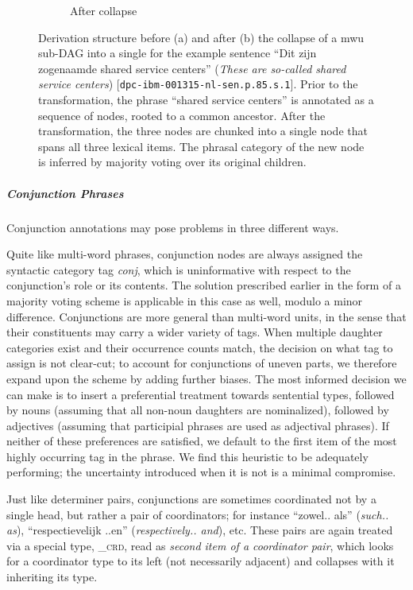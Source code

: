 \begin{figure}[t]
\begin{subfigure}[t]{0.43\textwidth}
        \caption{After collapse}
    \end{subfigure}
    \caption[Multi-Word Unit Collapse]{Derivation structure before (a) and after (b) the collapse of a mwu sub-DAG into a single for the example sentence ``Dit zijn zogenaamde shared service centers'' (\textit{These are so-called shared service centers}) [\texttt{dpc-ibm-001315-nl-sen.p.85.s.1}]. Prior to the transformation, the phrase ``shared service centers'' is annotated as a sequence of nodes, rooted to a common ancestor. After the transformation, the three nodes are chunked into a single node that spans all three lexical items. The phrasal category of the new node is inferred by majority voting over its original children.}
    \label{fig:mwu}
\end{figure}

\subparagraph{Conjunction Phrases}
Conjunction annotations may pose problems in three different ways.

Quite like multi-word phrases, conjunction nodes are always assigned the syntactic category tag \textit{conj}, which is uninformative with respect to the conjunction's role or its contents.
The solution prescribed earlier in the form of a majority voting scheme is applicable in this case as well, modulo a minor difference.
Conjunctions are more general than multi-word units, in the sense that their constituents may carry a wider variety of tags.
When multiple daughter categories exist and their occurrence counts match, the decision on what tag to assign is not clear-cut; to account for conjunctions of uneven parts, we therefore expand upon the scheme by adding further biases.
The most informed decision we can make is to insert a preferential treatment towards sentential types, followed by nouns (assuming that all non-noun daughters are nominalized), followed by adjectives (assuming that participial phrases are used as adjectival phrases).
If neither of these preferences are satisfied, we default to the first item of the most highly occurring tag in the phrase.
We find this heuristic to be adequately performing; the uncertainty introduced when it is not is a minimal compromise.

Just like determiner pairs, conjunctions are sometimes coordinated not by a single head, but rather a pair of coordinators; for instance ``zowel.. als'' (\textit{such.. as}), ``respectievelijk ..en'' (\textit{respectively.. and}), etc. 
These pairs are again treated via a special type, \textsc{\_crd}, read as \textit{second item of a coordinator pair}, which looks for a coordinator type to its left (not necessarily adjacent) and collapses with it inheriting its type.

